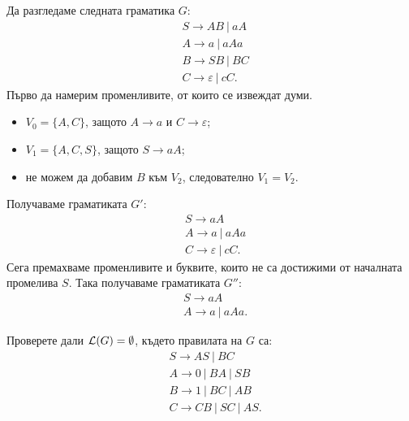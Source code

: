 \begin{example}
  Да разгледаме следната граматика $G$:
  \begin{align*}
    & S \to AB\ |\ aA\\
    & A \to a\ |\ aAa\\
    & B \to SB\ |\ BC\\
    & C \to \varepsilon\ |\ cC.
  \end{align*}
  Първо да намерим променливите, от които се извеждат думи.
  \begin{itemize}
  \item 
    $V_0 = \{A, C\}$, защото $A \to a$ и $C \to \varepsilon$;
  \item
    $V_1 = \{A, C, S\}$, защото $S \to aA$;
  \item
    не можем да добавим $B$ към $V_2$, следователно $V_1 = V_2$.
  \end{itemize}
  Получаваме граматиката $G'$:
  \begin{align*}
    & S \to aA\\
    & A \to a\ |\ aAa\\
    & C \to \varepsilon\ |\ cC.
  \end{align*}
  Сега премахваме променливите и буквите, които не са достижими от началната промелива $S$. Така получаваме граматиката $G''$:
  \begin{align*}
    & S \to aA\\
    & A \to a\ |\ aAa.
  \end{align*}
\end{example}

\begin{problem}
  Проверете дали $\mathcal{L}(G) = \emptyset$, където правилата на $G$ са:
  \begin{align*}
    & S \to AS\ |\ BC\\
    & A \to 0\ |\ BA\ |\ SB\\
    & B \to 1\ |\ BC\ |\ AB\\
    & C \to CB\ |\ SC\ |\ AS.
  \end{align*}
\end{problem}



